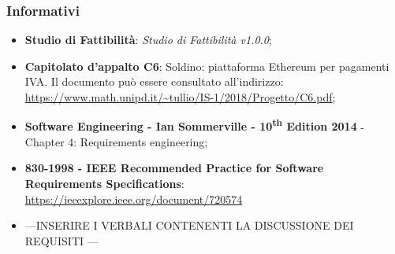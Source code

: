 \subsubsection{Informativi}
\begin{itemize}
	\item \textbf{Studio di Fattibilità}: \textit{Studio di Fattibilità v1.0.0};
	\item \textbf{Capitolato d'appalto C6}: Soldino: piattaforma Ethereum per pagamenti IVA. Il documento può essere consultato all'indirizzo: \textsf{\url{ https://www.math.unipd.it/~tullio/IS-1/2018/Progetto/C6.pdf}};
	\item \textbf{Software Engineering - Ian Sommerville - 10\textsuperscript{th} Edition 2014}
	\subitem - Chapter 4: Requirements engineering;
	\item \textbf{830-1998 - IEEE Recommended Practice for Software Requirements Specifications}: \textsf{\url{https://ieeexplore.ieee.org/document/720574}}
	\item ---INSERIRE I VERBALI CONTENENTI LA DISCUSSIONE DEI REQUISITI ---
	
\end{itemize}